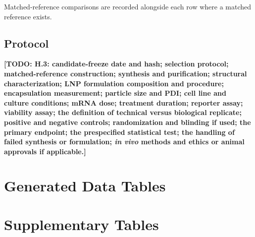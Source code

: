 \documentclass{article}
\newcommand{\TODO}[1]{\textbf{[TODO: #1]}}
\begin{document}
Matched-reference comparisons are recorded alongside each row where a matched reference exists.

\subsection{Protocol}
\label{app:protocol}

\TODO{H.3: candidate-freeze date and hash; selection protocol; matched-reference construction;
synthesis and purification; structural characterization; LNP formulation composition and
procedure; encapsulation measurement; particle size and PDI; cell line and culture conditions;
mRNA dose; treatment duration; reporter assay; viability assay; the definition of technical
versus biological replicate; positive and negative controls; randomization and blinding if used;
the primary endpoint; the prespecified statistical test; the handling of failed synthesis or
formulation; \emph{in vivo} methods and ethics or animal approvals if applicable.}

\section{Generated Data Tables}
\label{app:datatables}



\section{Supplementary Tables}
\label{app:stables}


\begingroup\footnotesize

\endgroup


\end{document}

